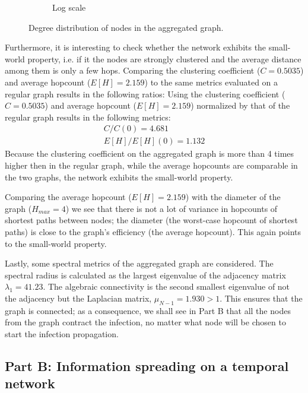 \documentclass[letterpaper]{article}
\begin{document}
\begin{figure}
\begin{subfigure}[b]{0.48\textwidth}
        \caption{Log scale}
	    \label{fig:degree_distribution_loglog}
    \end{subfigure}
    \caption{Degree distribution of nodes in the aggregated graph.}
    \label{fig:degree_distribution_aggregated}
\end{figure}

Furthermore, it is interesting to check whether the network exhibits the small-world property, i.e. if it the nodes are strongly clustered and the average distance among them is only a few hops. 
Comparing the clustering coefficient (\(C=0.5035\)) and average hopcount (\(E[H]=2.159\)) to the same metrics evaluated on a regular graph results in the following ratios: 
Using the clustering coefficient (\(C=0.5035\)) and average hopcount (\(E[H]=2.159\)) normalized by that of the regular graph results in the following metrics: %
\begin{align*}
C/C(0) = 4.681\\
E[H]/E[H](0) = 1.132
\end{align*}
Because the clustering coefficient on the aggregated graph is more than 4 times higher then in the regular graph, while the average hopcounts are comparable in the two graphs, the network exhibits the small-world property. 

Comparing the average hopcount (\(E[H]=2.159\)) with the diameter of the graph (\(H_{max}=4\)) we see that there is not a lot of variance in hopcounts of shortest paths between nodes; the diameter (the worst-case hopcount of shortest paths) is close to the graph's efficiency (the average hopcount). This again points to the small-world property.

Lastly, some spectral metrics of the aggregated graph are considered. The spectral radius is calculated as the largest eigenvalue of the adjacency matrix \(\lambda_1=41.23\). The algebraic connectivity is the second smallest eigenvalue of not the adjacency but the Laplacian matrix, \(\mu_{N-1}=1.930 > 1\). This ensures that the graph is connected; as a consequence, we shall see in Part B that all the nodes from the graph contract the infection, no matter what node will be chosen to start the infection propagation.


\subsection*{Part B: Information spreading on a temporal network}
\end{document}
